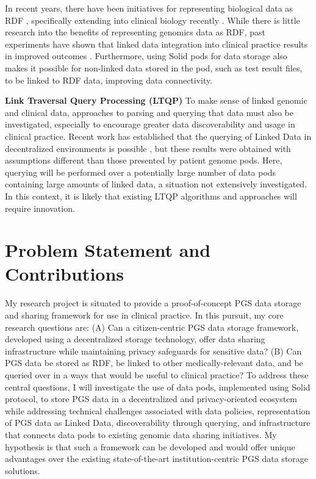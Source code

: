 \documentclass[runningheads]{llncs}
\begin{document}
In recent years, there have been initiatives for representing biological data as RDF \cite{sib_swiss_institute_of_bioinformatics_rdf_group_members_sib_2024}, specifically extending into clinical biology recently \cite{van_der_horst_bridging_2023}. 
While there is little research into the benefits of representing genomics data as RDF, past experiments have shown that linked data integration into clinical practice results in improved outcomes \cite{farinelli_linked_2015}.
Furthermore, using Solid pods for data storage also makes it possible for non-linked data stored in the pod, such as test result files, to be linked to RDF data, improving data connectivity. 


\textbf{Link Traversal Query Processing (LTQP)}
To make sense of linked genomic and clinical data, approaches to parsing and querying that data must also be investigated, especially to encourage greater data discoverability and usage in clinical practice.
Recent work has established that the querying of Linked Data in decentralized environments is possible \cite{taelman_evaluation_2023}, but these results were obtained with assumptions different than those presented by patient genome pods.
Here, querying will be performed over a potentially large number of data pods containing large amounts of linked data, a situation not extensively investigated. In this context, it is likely that existing LTQP algorithms and approaches will require innovation. 


\section{Problem Statement and Contributions}

My research project is situated to provide a proof-of-concept PGS data storage and sharing framework for use in clinical practice. 
In this pursuit, my core research questions are: 
(A) Can a citizen-centric PGS data storage framework, developed using a decentralized storage technology, offer data sharing infrastructure while maintaining privacy safeguards for sensitive data? 
(B) Can PGS data be stored as RDF, be linked to other medically-relevant data, and be queried over in a ways that would be useful to clinical practice?
To address these central questions, I will investigate the use of data pods, implemented using Solid protocol, to store PGS data in a decentralized and privacy-oriented ecosystem while addressing technical challenges associated with data policies, representation of PGS data as Linked Data, discoverability through querying, and infrastructure that connects data pods to existing genomic data sharing initiatives. 
My hypothesis is that such a framework can be developed and would offer unique advantages over the existing state-of-the-art institution-centric PGS data storage solutions. 
\end{document}
